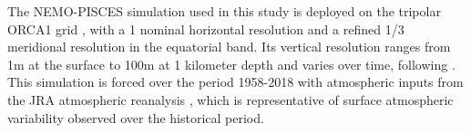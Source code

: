 The NEMO-PISCES simulation used in this study is deployed on the tripolar ORCA1 grid \citep{madecGlobalOceanMesh1996}, with a 1\degree{} nominal horizontal resolution and a refined 1/3\degree{} meridional resolution in the equatorial band. Its vertical resolution ranges from 1m at the surface to 100m at 1 kilometer depth and varies over time, following \cite{levierFreeSurfaceVariable2007}. This simulation  is forced over the period 1958-2018 with atmospheric inputs from the JRA atmospheric reanalysis \citep{kobayashiJRA55ReanalysisGeneral2015}, which is representative of  surface atmospheric variability observed over the historical period. 

